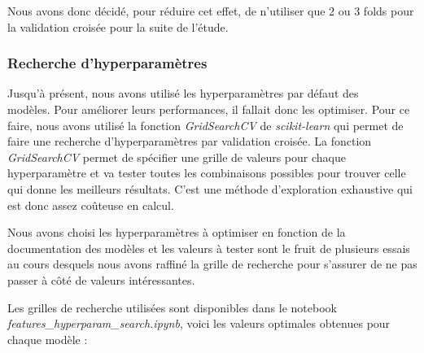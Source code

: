 \documentclass{article}
\begin{document}
Nous avons donc décidé, pour réduire cet effet, de n'utiliser que 2 ou 3 folds pour la
validation croisée pour la suite de l'étude.

\subsubsection{Recherche d'hyperparamètres}
Jusqu'à présent, nous avons utilisé les hyperparamètres par défaut des \\modèles. Pour améliorer
leurs performances, il fallait donc les optimiser. Pour ce faire, nous avons utilisé la fonction
\textit{GridSearchCV} \cite{GSCV} de \textit{scikit-learn} qui permet de faire une recherche
d'hyperparamètres par validation croisée. La fonction \textit{GridSearchCV} permet de spécifier
une grille de valeurs pour chaque hyperparamètre et va tester toutes les combinaisons possibles
pour trouver celle qui donne les meilleurs résultats. C'est une méthode d'exploration exhaustive
qui est donc assez coûteuse en calcul.

Nous avons choisi les hyperparamètres à optimiser en fonction de la documentation des modèles
et les valeurs à tester sont le fruit de plusieurs essais au cours desquels nous avons
raffiné la grille de recherche pour s'assurer de ne pas passer à côté de valeurs intéressantes.

Les grilles de recherche utilisées sont disponibles dans le notebook \\
\textit{features\_hyperparam\_search.ipynb}, voici les valeurs optimales obtenues pour
chaque modèle :
\end{document}
